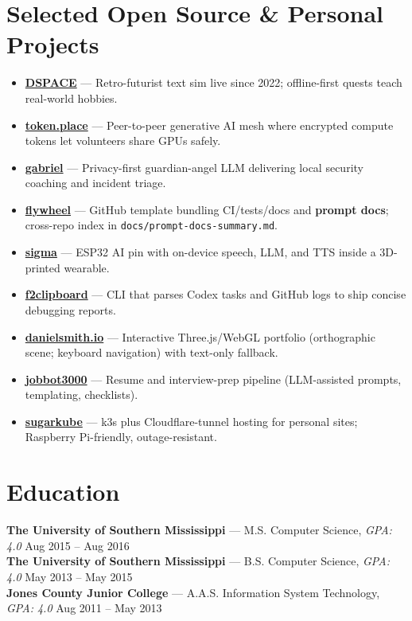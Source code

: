 \documentclass[10pt]{article}
\begin{document}
\vspace{-2mm}
\section*{Selected Open Source \& Personal Projects}
\begin{itemize}
  \item \textbf{\href{https://github.com/democratizedspace/dspace/tree/v3}{DSPACE}} — Retro-futurist text sim
live since 2022; offline-first quests teach real-world hobbies.
  \item \textbf{\href{https://token.place}{token.place}} — Peer-to-peer generative AI mesh where
encrypted compute tokens let volunteers share GPUs safely.
  \item \textbf{\href{https://github.com/futuroptimist/gabriel}{gabriel}} — Privacy-first guardian-angel
LLM delivering local security coaching and incident triage.
  \item \textbf{\href{https://github.com/futuroptimist/flywheel}{flywheel}} — GitHub template bundling
CI/tests/docs and \textbf{prompt docs}; cross-repo index in \texttt{docs/prompt-docs-summary.md}.
  \item \textbf{\href{https://github.com/futuroptimist/sigma}{sigma}} — ESP32 AI pin with on-device
speech, LLM, and TTS inside a 3D-printed wearable.
  \item \textbf{\href{https://github.com/futuroptimist/f2clipboard}{f2clipboard}} — CLI that parses Codex
tasks and GitHub logs to ship concise debugging reports.
  \item \textbf{\href{https://github.com/futuroptimist/danielsmith.io}{danielsmith.io}} — Interactive
Three.js/WebGL portfolio (orthographic scene; keyboard navigation) with text-only fallback.
  \item \textbf{\href{https://github.com/futuroptimist/jobbot3000}{jobbot3000}} — Resume and interview-prep
pipeline (LLM-assisted prompts, templating, checklists).
  \item \textbf{\href{https://github.com/futuroptimist/sugarkube}{sugarkube}} — k3s plus Cloudflare-tunnel
hosting for personal sites; Raspberry Pi-friendly, outage-resistant.
\end{itemize}

\vspace{-2mm}
\section*{Education}
\textbf{The University of Southern Mississippi} — M.S. Computer Science, \textit{GPA: 4.0} \hfill Aug 2015 -- Aug 2016 \\
\textbf{The University of Southern Mississippi} — B.S. Computer Science, \textit{GPA: 4.0} \hfill May 2013 -- May 2015 \\
\textbf{Jones County Junior College} — A.A.S. Information System Technology, \textit{GPA: 4.0} \hfill Aug 2011 -- May 2013
\end{document}
